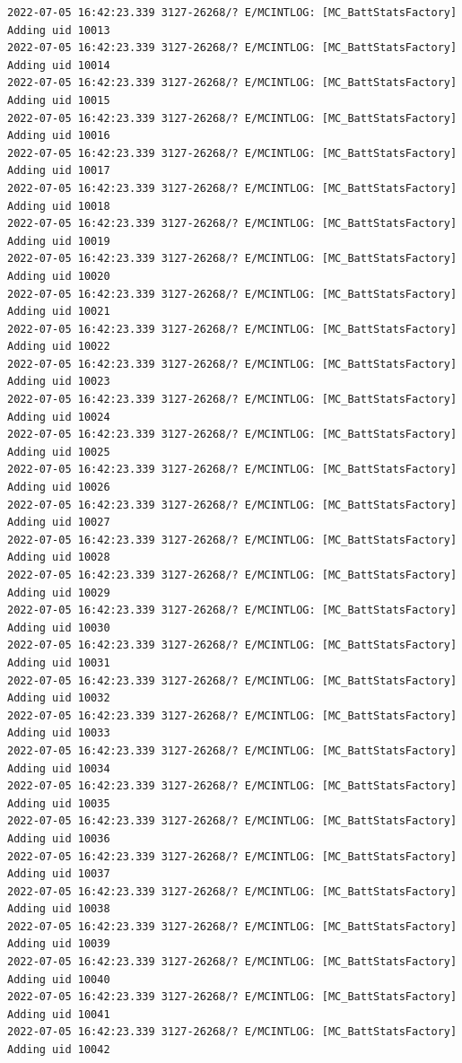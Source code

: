 \documentclass[a4paper,12pt]{book}
\begin{document}
\begin{lstlisting}
2022-07-05 16:42:23.339 3127-26268/? E/MCINTLOG: [MC_BattStatsFactory] Adding uid 10013
2022-07-05 16:42:23.339 3127-26268/? E/MCINTLOG: [MC_BattStatsFactory] Adding uid 10014
2022-07-05 16:42:23.339 3127-26268/? E/MCINTLOG: [MC_BattStatsFactory] Adding uid 10015
2022-07-05 16:42:23.339 3127-26268/? E/MCINTLOG: [MC_BattStatsFactory] Adding uid 10016
2022-07-05 16:42:23.339 3127-26268/? E/MCINTLOG: [MC_BattStatsFactory] Adding uid 10017
2022-07-05 16:42:23.339 3127-26268/? E/MCINTLOG: [MC_BattStatsFactory] Adding uid 10018
2022-07-05 16:42:23.339 3127-26268/? E/MCINTLOG: [MC_BattStatsFactory] Adding uid 10019
2022-07-05 16:42:23.339 3127-26268/? E/MCINTLOG: [MC_BattStatsFactory] Adding uid 10020
2022-07-05 16:42:23.339 3127-26268/? E/MCINTLOG: [MC_BattStatsFactory] Adding uid 10021
2022-07-05 16:42:23.339 3127-26268/? E/MCINTLOG: [MC_BattStatsFactory] Adding uid 10022
2022-07-05 16:42:23.339 3127-26268/? E/MCINTLOG: [MC_BattStatsFactory] Adding uid 10023
2022-07-05 16:42:23.339 3127-26268/? E/MCINTLOG: [MC_BattStatsFactory] Adding uid 10024
2022-07-05 16:42:23.339 3127-26268/? E/MCINTLOG: [MC_BattStatsFactory] Adding uid 10025
2022-07-05 16:42:23.339 3127-26268/? E/MCINTLOG: [MC_BattStatsFactory] Adding uid 10026
2022-07-05 16:42:23.339 3127-26268/? E/MCINTLOG: [MC_BattStatsFactory] Adding uid 10027
2022-07-05 16:42:23.339 3127-26268/? E/MCINTLOG: [MC_BattStatsFactory] Adding uid 10028
2022-07-05 16:42:23.339 3127-26268/? E/MCINTLOG: [MC_BattStatsFactory] Adding uid 10029
2022-07-05 16:42:23.339 3127-26268/? E/MCINTLOG: [MC_BattStatsFactory] Adding uid 10030
2022-07-05 16:42:23.339 3127-26268/? E/MCINTLOG: [MC_BattStatsFactory] Adding uid 10031
2022-07-05 16:42:23.339 3127-26268/? E/MCINTLOG: [MC_BattStatsFactory] Adding uid 10032
2022-07-05 16:42:23.339 3127-26268/? E/MCINTLOG: [MC_BattStatsFactory] Adding uid 10033
2022-07-05 16:42:23.339 3127-26268/? E/MCINTLOG: [MC_BattStatsFactory] Adding uid 10034
2022-07-05 16:42:23.339 3127-26268/? E/MCINTLOG: [MC_BattStatsFactory] Adding uid 10035
2022-07-05 16:42:23.339 3127-26268/? E/MCINTLOG: [MC_BattStatsFactory] Adding uid 10036
2022-07-05 16:42:23.339 3127-26268/? E/MCINTLOG: [MC_BattStatsFactory] Adding uid 10037
2022-07-05 16:42:23.339 3127-26268/? E/MCINTLOG: [MC_BattStatsFactory] Adding uid 10038
2022-07-05 16:42:23.339 3127-26268/? E/MCINTLOG: [MC_BattStatsFactory] Adding uid 10039
2022-07-05 16:42:23.339 3127-26268/? E/MCINTLOG: [MC_BattStatsFactory] Adding uid 10040
2022-07-05 16:42:23.339 3127-26268/? E/MCINTLOG: [MC_BattStatsFactory] Adding uid 10041
2022-07-05 16:42:23.339 3127-26268/? E/MCINTLOG: [MC_BattStatsFactory] Adding uid 10042

\end{lstlisting}
\end{document}
